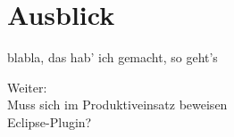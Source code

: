 \chapter{Ausblick}
\label{sec:extro}
blabla, das hab' ich gemacht, so geht's

Weiter: \\
Muss sich im Produktiveinsatz beweisen\\
Eclipse-Plugin?\\


